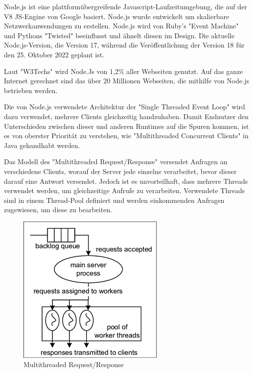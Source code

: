 \label{sec:nodejs}
Node.js ist eine plattformübergreifende Javascript-Laufzeitumgebung, die auf der V8 JS-Engine von Google basiert. Node.js wurde entwickelt um skalierbare Netzwerkanwendungen zu erstellen. Node.js wird von Ruby's "Event Machine" und Pythons "Twisted" beeinflusst und ähnelt diesen im Design. Die aktuelle Node.js-Version, die Version 17, während die Veröffentlichung der Version 18 für den 25. Oktober 2022 geplant ist.\cite{NodeInfo}

Laut "W3Techs" wird Node.Js von 1,2\% aller Webseiten genutzt. Auf das ganze Internet gerechnet sind das über 20 Millionen Webseiten, die mithilfe von Node.js betrieben werden. \cite{NodeInfo}\cite{Node}

Die von Node.js verwendete Architektur der "Single Threaded Event Loop" wird dazu verwendet, mehrere Clients gleichzeitig handzuhaben. Damit Endnutzer den  Unterschieden zwischen dieser und anderen Runtimes auf die Spuren kommen, ist es von oberster Priorität zu verstehen, wie "Multithreaded Concurrent Clients" in Java gehandhabt werden. \cite{NodeJs.dev}


Das Modell des "Multithreaded Request/Response" versendet Anfragen an verschiedene Clients, worauf der Server jede einzelne verarbeitet, bevor dieser darauf eine Antwort versendet. Jedoch ist es unvorteilhaft, dass mehrere Threads verwendet werden, um gleichzeitige Aufrufe zu verarbeiten. Verwendete Threads sind in einem Thread-Pool definiert und werden einkommenden Anfragen zugewiesen, um diese zu bearbeiten. \cite{Arocom}



\begin{figure}[H]
    \centering
    \includegraphics{media/NodeJs/MultiThreadedRequestResponse.png}
    \caption{Multithreaded Request/Response \cite{Multithreaded}}
\end{figure}

